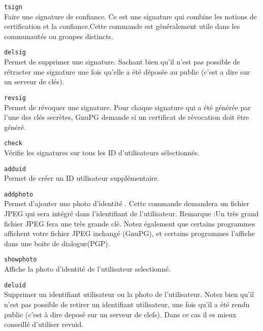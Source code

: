                \texttt{tsign }\\ 
              Faire une signature de confiance. Ce est une signature qui combine les notions de certification 
              et la confiance.Cette commande  est généralement utile dans les communautés ou groupes distincts.

              \texttt{delsig }\\ 
             Permet de supprimer une signature. Sachant bien qu'il n'est pas possible de
                      rétracter une signature une fois qu'elle a été déposée au public
                      (c'est a dire sur un serveur de clés).

              
               \texttt{revsig }\\ 
              Permet de révoquer une signature. Pour chaque signature qui a été
                      générée par l'une des clés secrètes, GnuPG demande si
                      un certificat de révocation doit être généré.


               \texttt{check  }\\ 
              Vérifie les signatures sur tous les ID d'utilisateurs sélectionnés.


               \texttt{adduid }\\ 
              Permet de créer un ID utilisateur supplémentaire.


               \texttt{addphoto}\\ 
                  Permet d'ajouter une photo d'identité . Cette commande demandera un
                      fichier JPEG qui sera intégré dans l'identifiant de l'utilisateur. 
                      Remarque :Un très grand fichier JPEG fera une très grande clé.
                      Notez également que certains programmes affichent votre  fichier JPEG
                      inchangé (GnuPG), et certains programmes l'affiche dans une boite de dialogue(PGP).


               \texttt{showphoto}\\ 
                     
                     Affiche la photo d'identité de l'utilisateur selectionné.


               \texttt{deluid }\\ 
             Supprimer un identifiant utilisateur ou la photo de l'utilisateur. Notez bien qu'il
                     n'est pas possible de retirer un identifiant utilisateur, une fois qu'il a été
                     rendu public (c'est à dire deposé sur un serveur de clefs). Dans ce cas il
                     es mieux conseillé d'utiliser revuid.


